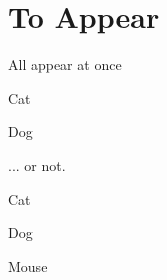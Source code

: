 \documentclass[ucs,10pt]{beamer}
\begin{document}
\section{To Appear}
\begin{frame}{All appear at once}
	
	\begin{minipage}[b]{.4\linewidth}
		\begin{center}
			Cat
		\end{center}
	\end{minipage}
	\begin{minipage}[b]{.4\linewidth}
		\begin{center}
			Dog
		\end{center}
	\end{minipage}

\end{frame}
\begin{frame}{... or not.}

	\begin{center}
		Cat
	\end{center}

	\begin{center}
		Dog
	\end{center}

	\pause \begin{center}
		Mouse
	\end{center}

\end{frame}
\end{document}
